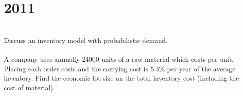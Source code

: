 \section*{2011}
\vspace{-.5cm}
\hrulefill \smallskip\\
 Discuss an inventory model with probabilistic demand.
\\\\
 A company uses annually 24000 units of a raw material which costs  per unit. Placing each order costs  and the carrying cost is 5.4\% per year of the average inventory. Find the economic lot size an the total inventory cost (including the cost of material).